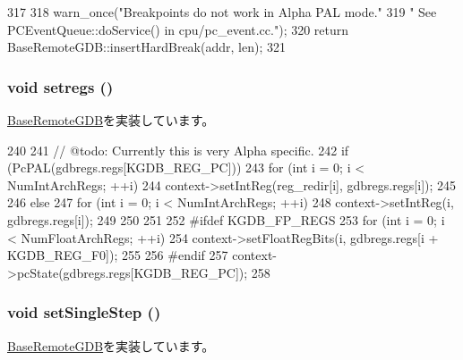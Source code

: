 \begin{DoxyCode}
317 {
318     warn_once("Breakpoints do not work in Alpha PAL mode.\n"
319               "      See PCEventQueue::doService() in cpu/pc_event.cc.\n");
320     return BaseRemoteGDB::insertHardBreak(addr, len);
321 }
\end{DoxyCode}
\hypertarget{classAlphaISA_1_1RemoteGDB_a2051121b6bc93c8ca3856bbeeca7bdc1}{
\subsubsection[{setregs}]{\setlength{\rightskip}{0pt plus 5cm}void setregs ()}}
\label{classAlphaISA_1_1RemoteGDB_a2051121b6bc93c8ca3856bbeeca7bdc1}


\hyperlink{classBaseRemoteGDB_a6b0b51dc196f12756cc0ec49a3ae6a6a}{BaseRemoteGDB}を実装しています。


\begin{DoxyCode}
240 {
241     // @todo: Currently this is very Alpha specific.
242     if (PcPAL(gdbregs.regs[KGDB_REG_PC])) {
243         for (int i = 0; i < NumIntArchRegs; ++i) {
244             context->setIntReg(reg_redir[i], gdbregs.regs[i]);
245         }
246     } else {
247         for (int i = 0; i < NumIntArchRegs; ++i) {
248             context->setIntReg(i, gdbregs.regs[i]);
249         }
250     }
251 
252 #ifdef KGDB_FP_REGS
253     for (int i = 0; i < NumFloatArchRegs; ++i) {
254         context->setFloatRegBits(i, gdbregs.regs[i + KGDB_REG_F0]);
255     }
256 #endif
257     context->pcState(gdbregs.regs[KGDB_REG_PC]);
258 }
\end{DoxyCode}
\hypertarget{classAlphaISA_1_1RemoteGDB_a40d5da340fdb741de8cd3ffbc69708fe}{
\subsubsection[{setSingleStep}]{\setlength{\rightskip}{0pt plus 5cm}void setSingleStep ()}}
\label{classAlphaISA_1_1RemoteGDB_a40d5da340fdb741de8cd3ffbc69708fe}


\hyperlink{classBaseRemoteGDB_a253d4b1107e84fe80036d1826067741a}{BaseRemoteGDB}を実装しています。


